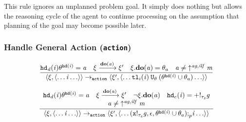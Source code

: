 This rule ignores an unplanned problem goal.    It simply does nothing but allows the reasoning cycle of the agent to continue processing on the assumption that planning of the goal may become possible later.



\subsubsection*{Handle General Action ({\tt action})}

\begin{equation}
  \frac{
    \mathit{{\tt hd}_d}(\mathit{i})\theta^{{\tt hd}(\mathit{i})} = \mathit{a}
\quad \xi \xrightarrow{\mathrm{\mathbf{do}}(\mathit{a})} \xi' 
\quad \xi.\mathrm{\mathbf{do}}(\mathit{a}) = \theta_a
\quad \mathit{a} \neq \mathit{\uparrow^{\mathit{ag},ilf}\mathit{m}}
}{
\langle \xi, \langle \ldots \mathit{i} \ldots \rangle \rangle \rightarrow_{\tt action} 
\langle \xi', \langle \ldots {\tt tl}_i(\mathit{i}) \: {\tt U}_{\theta} \: (\theta^{{\tt hd}(\mathit{i})} \cup \theta_a) \ldots \rangle \rangle
}
\end{equation}

\begin{equation}
\frac{
\begin{array}{c}
  \mathit{{\tt hd}_d}(\mathit{i})\theta^{{\tt hd}(\mathit{i})} = \mathit{a}
  \quad \xi \xrightarrow{\mathrm{\mathbf{do}}(\mathit{a})} \xi'
\quad \neg \xi.\mathrm{\mathbf{do}}(\mathit{a}) 
\quad {\tt hd}_e(\mathit{i}) = +!_{\mathit{\tau_{\mathit{g}}}}\mathit{g} \\
\mathit{a} \neq \mathit{\uparrow^{\mathit{ag},ilf}\mathit{m}}
\end{array}
}{
\langle \xi, \langle \ldots  \mathit{i} \ldots \rangle \rangle \rightarrow_{\tt action} 
\langle \xi', \langle \ldots 
(\mathit{\mathtt{x}!_{\mathit{\tau_{\mathit{g}}}}\mathit{g}}, \epsilon, {\theta^{{\tt hd}(\mathit{i})} \cup \theta_a}) {\tt ;}_p \mathit{i} \ldots \rangle \rangle }
\end{equation}

